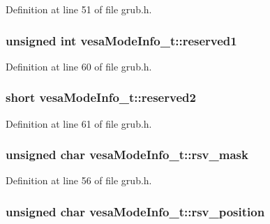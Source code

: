 Definition at line 51 of file grub.\+h.

\hypertarget{structvesaModeInfo__t_aacef0071c533de26e708289e474a0542}{
\subsubsection[{reserved1}]{\setlength{\rightskip}{0pt plus 5cm}unsigned int vesa\+Mode\+Info\+\_\+t\+::reserved1}}\label{structvesaModeInfo__t_aacef0071c533de26e708289e474a0542}


Definition at line 60 of file grub.\+h.

\hypertarget{structvesaModeInfo__t_a5ffbef6f6a9ac0ae6975827208b77ec5}{
\subsubsection[{reserved2}]{\setlength{\rightskip}{0pt plus 5cm}short vesa\+Mode\+Info\+\_\+t\+::reserved2}}\label{structvesaModeInfo__t_a5ffbef6f6a9ac0ae6975827208b77ec5}


Definition at line 61 of file grub.\+h.

\hypertarget{structvesaModeInfo__t_a8b424620d78b885292f29849acfe962c}{
\subsubsection[{rsv\+\_\+mask}]{\setlength{\rightskip}{0pt plus 5cm}unsigned char vesa\+Mode\+Info\+\_\+t\+::rsv\+\_\+mask}}\label{structvesaModeInfo__t_a8b424620d78b885292f29849acfe962c}


Definition at line 56 of file grub.\+h.

\hypertarget{structvesaModeInfo__t_a2af8762aa842598e8a6a33872a83b5ab}{
\subsubsection[{rsv\+\_\+position}]{\setlength{\rightskip}{0pt plus 5cm}unsigned char vesa\+Mode\+Info\+\_\+t\+::rsv\+\_\+position}}\label{structvesaModeInfo__t_a2af8762aa842598e8a6a33872a83b5ab}


